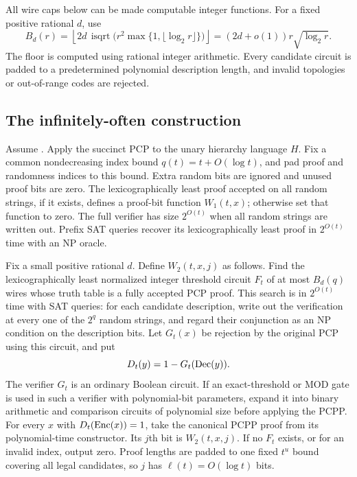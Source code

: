 All wire caps below can be made computable integer functions. For a
fixed positive rational $d$, use
\begin{equation}\label{eq:cap}
 B_d(r)=\left\lfloor 2d\,\operatorname{isqrt}
 \bigl(r^2\max\{1,\lfloor\log_2r\rfloor\}\bigr)\right\rfloor
 =(2d+o(1))r\sqrt{\log_2r}.
\end{equation}
The floor is computed using rational integer arithmetic. Every
candidate circuit is padded to a predetermined polynomial description
length, and invalid topologies or out-of-range codes are rejected.

\subsection{The infinitely-often construction}
\label{subsec:io}

Assume \HTC. Apply the succinct PCP to the unary hierarchy language
$H$. Fix a common nondecreasing index bound
$q(t)=t+O(\log t)$, and pad proof and randomness indices to this bound.
Extra random bits are ignored and unused proof bits are zero.
The lexicographically least proof accepted on all random strings,
if it exists, defines a proof-bit function $W_1(t,x)$; otherwise set
that function to zero. The full verifier has size $2^{O(t)}$ when all
random strings are written out. Prefix SAT queries recover its
lexicographically least proof in $2^{O(t)}$ time with an NP oracle.

Fix a small positive rational $d$. Define $W_2(t,x,j)$ as follows.
Find the lexicographically least normalized integer threshold circuit
$F_t$ of at most $B_d(q)$ wires whose truth table is a fully accepted
PCP proof. This search is in $2^{O(t)}$ time with SAT queries: for
each candidate description, write out the verification at every one
of the $2^q$ random strings, and regard their conjunction as an NP
condition on the description bits. Let $G_t(x)$ be rejection by the
original PCP using this circuit, and put
\[
 D_t(y)=1-G_t(\operatorname{Dec}(y)).
\]
The verifier $G_t$ is an ordinary Boolean circuit. If an
exact-threshold or MOD gate is used in such a verifier with
polynomial-bit parameters, expand it into binary arithmetic and
comparison circuits of polynomial size before applying the PCPP.
For every $x$ with $D_t(\operatorname{Enc}(x))=1$, take the canonical PCPP proof
from its polynomial-time constructor. Its $j$th bit is $W_2(t,x,j)$.
If no $F_t$ exists, or for an invalid index, output zero. Proof lengths
are padded to one fixed $t^u$ bound covering all legal candidates, so
$j$ has $\ell(t)=O(\log t)$ bits.

